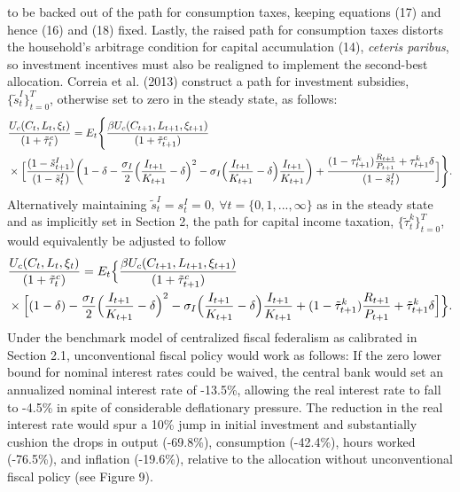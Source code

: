 \documentclass[12pt,letterpaper]{article}
\begin{document}
\noindent to be backed out of the path for consumption taxes, keeping equations (17) and hence (16) and (18) fixed. Lastly, the raised path for consumption taxes distorts the household's arbitrage condition for capital accumulation (14), \textit{ceteris paribus}, so investment incentives must also be realigned to implement the second-best allocation. Correia et al. (2013) construct a path for investment subsidies, $\{ \tilde{s}_t^I \}_{t=0}^{T}$, otherwise set to zero in the steady state, as follows: 
\begin{align}
&\frac{U_c (C_t, L_t, \xi_t )}{(1+\tilde{\tau}_t^c)} = E_t \Bigg\{ \frac{ \beta U_c (C_{t+1}, L_{t+1}, \xi_{t+1})} {(1+\tilde{\tau}_{t+1}^c)} \\ \notag & \times \Big[ \frac{(1-\tilde{s}^I_{t+1})}{(1-\tilde{s}^I_{t})} \bigg(1 - \delta - \frac{\sigma_I}{2} \Big( \frac{I_{t+1}}{K_{t+1}} - \delta \Big)^2  - \sigma_I \Big( \frac{I_{t+1}}{K_{t+1}} - \delta \Big) \frac{I_{t+1}}{K_{t+1}} \bigg) + \frac{(1 - {\tau}_{t+1}^k) \frac{R_{t+1}}{P_{t+1}} + {\tau}_{t+1}^k \delta}{(1-\tilde{s}^I_{t})} \Big] \Bigg\}.
\end{align}
\noindent Alternatively maintaining $ \tilde{s}_t^I = s_t^I = 0, \ \forall t=\{0,1,..., \infty\}$ as in the steady state and as implicitly set in Section 2, the path for capital income taxation, $\{ \tilde{\tau}_t^k \}_{t=0}^{T}$, would equivalently be adjusted to follow
\begin{align}
&\frac{U_c (C_t, L_t, \xi_t )}{(1+\tilde{\tau}_t^c)} = E_t \Big\{ \frac{ \beta U_c (C_{t+1}, L_{t+1}, \xi_{t+1})} {(1+\tilde{\tau}_{t+1}^c)} \\ \notag & \times \Big[ (1 - \delta)  - \frac{\sigma_I}{2} \Big( \frac{I_{t+1}}{K_{t+1}} - \delta \Big)^2  - \sigma_I \Big( \frac{I_{t+1}}{K_{t+1}} - \delta \Big) \frac{I_{t+1}}{K_{t+1}} + (1 - \tilde{\tau}_{t+1}^k) \frac{R_{t+1}}{P_{t+1}} + \tilde{\tau}_{t+1}^k \delta \Big] \Big\}. 
\end{align}
\noindent Under the benchmark model of centralized fiscal federalism as calibrated in Section 2.1, unconventional fiscal policy would work as follows: If the zero lower bound for nominal interest rates could be waived, the central bank would set an annualized nominal interest rate of -13.5\%, allowing the real interest rate to fall to -4.5\% in spite of considerable deflationary pressure. The reduction in the real interest rate would spur a 10\% jump in initial investment and substantially cushion the drops in output (-69.8\%), consumption (-42.4\%), hours worked (-76.5\%), and inflation (-19.6\%), relative to the allocation without unconventional fiscal policy (see Figure 9). 
\end{document}
